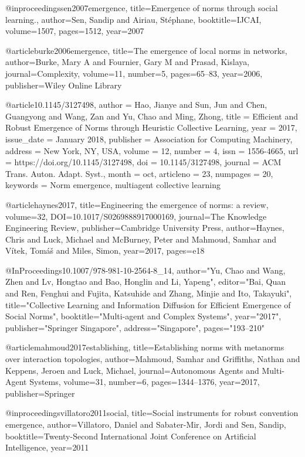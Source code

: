 @inproceedings{sen2007emergence,
  title={Emergence of norms through social learning.},
  author={Sen, Sandip and Airiau, St{\'e}phane},
  booktitle={IJCAI},
  volume={1507},
  pages={1512},
  year={2007}
}

@article{burke2006emergence,
  title={The emergence of local norms in networks},
  author={Burke, Mary A and Fournier, Gary M and Prasad, Kislaya},
  journal={Complexity},
  volume={11},
  number={5},
  pages={65--83},
  year={2006},
  publisher={Wiley Online Library}
}

@article{10.1145/3127498,
author = {Hao, Jianye and Sun, Jun and Chen, Guangyong and Wang, Zan and Yu, Chao and Ming, Zhong},
title = {Efficient and Robust Emergence of Norms through Heuristic Collective Learning},
year = {2017},
issue_date = {January 2018},
publisher = {Association for Computing Machinery},
address = {New York, NY, USA},
volume = {12},
number = {4},
issn = {1556-4665},
url = {https://doi.org/10.1145/3127498},
doi = {10.1145/3127498},
journal = {ACM Trans. Auton. Adapt. Syst.},
month = oct,
articleno = {23},
numpages = {20},
keywords = {Norm emergence, multiagent collective learning}
}

@article{haynes2017, title={Engineering the emergence of norms: a review}, volume={32}, DOI={10.1017/S0269888917000169}, journal={The Knowledge Engineering Review}, publisher={Cambridge University Press}, author={Haynes, Chris and Luck, Michael and McBurney, Peter and Mahmoud, Samhar and Vítek, Tomáš and Miles, Simon}, year={2017}, pages={e18}}

@InProceedings{10.1007/978-981-10-2564-8_14,
author="Yu, Chao
and Wang, Zhen
and Lv, Hongtao
and Bao, Honglin
and Li, Yapeng",
editor="Bai, Quan
and Ren, Fenghui
and Fujita, Katsuhide
and Zhang, Minjie
and Ito, Takayuki",
title="Collective Learning and Information Diffusion for Efficient Emergence of Social Norms",
booktitle="Multi-agent and Complex Systems",
year="2017",
publisher="Springer Singapore",
address="Singapore",
pages="193--210"
}

@article{mahmoud2017establishing,
  title={Establishing norms with metanorms over interaction topologies},
  author={Mahmoud, Samhar and Griffiths, Nathan and Keppens, Jeroen and Luck, Michael},
  journal={Autonomous Agents and Multi-Agent Systems},
  volume={31},
  number={6},
  pages={1344--1376},
  year={2017},
  publisher={Springer}
}

@inproceedings{villatoro2011social,
  title={Social instruments for robust convention emergence},
  author={Villatoro, Daniel and Sabater-Mir, Jordi and Sen, Sandip},
  booktitle={Twenty-Second International Joint Conference on Artificial Intelligence},
  year={2011}
}


